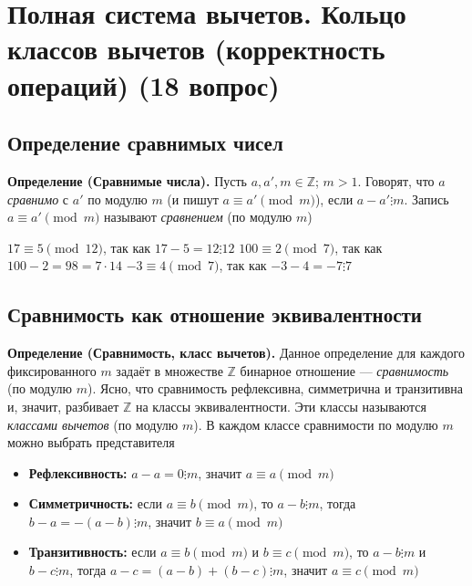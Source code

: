 \documentclass[a4paper,12pt]{article}
\theoremstyle{definition}
\theoremstyle{plain}
\theoremstyle{remark}
\begin{document}
	
	
	
	
	
	\newpage
	\section{Полная система вычетов. Кольцо классов вычетов (корректность операций) (18 вопрос)}
	
	\subsection{Определение сравнимых чисел}
	
	\noindent \textbf{Определение (Сравнимые числа).}
	Пусть $a, a', m \in \mathbb{Z}$; $m > 1$. Говорят, что $a$ \textit{сравнимо} с $a'$ по модулю $m$ (и пишут $a \equiv a' \pmod{m}$), если $a - a' \vdots m$. Запись $a \equiv a' \pmod{m}$ называют \textit{сравнением} (по модулю $m$)
	
	\begin{tcolorbox}[colback=blue!5, colframe=blue!40!black, title=Пример]
		$17 \equiv 5 \pmod{12}$, так как $17-5 = 12 \vdots 12$
		$100 \equiv 2 \pmod{7}$, так как $100-2 = 98 = 7 \cdot 14$
		$-3 \equiv 4 \pmod{7}$, так как $-3-4 = -7 \vdots 7$
	\end{tcolorbox}
	
	\subsection{Сравнимость как отношение эквивалентности}
	
	\noindent \textbf{Определение (Сравнимость, класс вычетов).}
	Данное определение для каждого фиксированного $m$ задаёт в множестве $\mathbb{Z}$ бинарное отношение — \textit{сравнимость} (по модулю $m$). Ясно, что сравнимость рефлексивна, симметрична и транзитивна и, значит, разбивает $\mathbb{Z}$ на классы эквивалентности. Эти классы называются \textit{классами вычетов} (по модулю $m$). В каждом классе сравнимости по модулю $m$ можно выбрать представителя
	
	\begin{tcolorbox}[colback=green!5, colframe=green!50!black, title=Проверка свойств отношения сравнимости]
		\begin{itemize}
			\item \textbf{Рефлексивность:} $a - a = 0 \vdots m$, значит $a \equiv a \pmod{m}$
			\item \textbf{Симметричность:} если $a \equiv b \pmod{m}$, то $a-b \vdots m$, тогда $b-a = -(a-b) \vdots m$, значит $b \equiv a \pmod{m}$
			\item \textbf{Транзитивность:} если $a \equiv b \pmod{m}$ и $b \equiv c \pmod{m}$, то $a-b \vdots m$ и $b-c \vdots m$, тогда $a-c = (a-b)+(b-c) \vdots m$, значит $a \equiv c \pmod{m}$
		\end{itemize}
	\end{tcolorbox}
	
\end{document}
